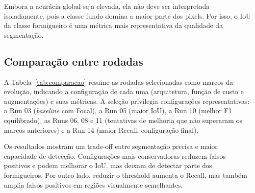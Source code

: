 \documentclass[10pt,a4paper,twocolumn]{article}
\begin{document}
Embora a acurácia global seja elevada, ela não deve ser interpretada isoladamente, pois a classe fundo domina a maior parte dos pixels. Por isso, o IoU da classe formigueiro é uma métrica mais representativa da qualidade da segmentação.

\subsection{Comparação entre rodadas}

A Tabela~\ref{tab:comparacao} resume as rodadas selecionadas como marcos da evolução, indicando a configuração de cada uma (arquitetura, função de custo e augmentações) e suas métricas. A seleção privilegia configurações representativas: a Run 03 (\textit{baseline} com Focal), a Run 05 (maior IoU), a Run 10 (melhor F1 equilibrado), as Runs 06, 08 e 11 (tentativas de melhoria que não superaram os marcos anteriores) e a Run 14 (maior Recall, configuração final).

\begin{table}[H]
\centering
\caption{Comparação entre configurações selecionadas.}
\label{tab:comparacao}
\end{table}

Os resultados mostram um trade-off entre segmentação precisa e maior capacidade de detecção. Configurações mais conservadoras reduzem falsos positivos e podem melhorar o IoU, mas deixam de detectar parte dos formigueiros. Por outro lado, reduzir o threshold aumenta o Recall, mas também amplia falsos positivos em regiões visualmente semelhantes.
\end{document}
